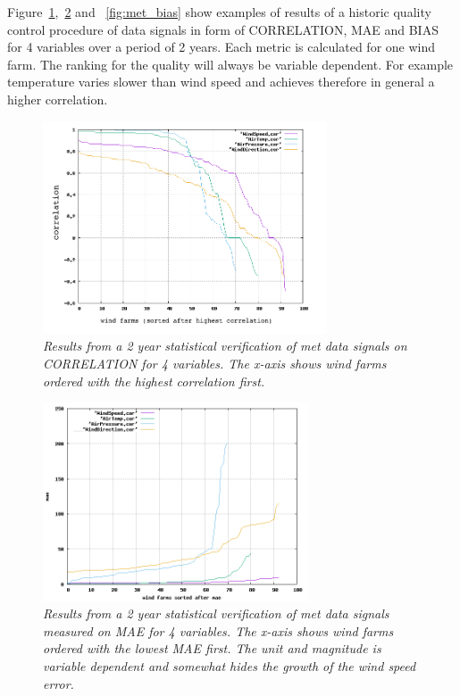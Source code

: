 Figure~\ref{fig:met_cor},~\ref{fig:met_mae} and ~\ref{fig:met_bias}  show examples of results of a historic quality control procedure of data signals in form of CORRELATION, MAE and BIAS for 4 variables over a period of 2 years. Each metric is calculated for one wind farm. The ranking for the quality will always be variable dependent. For example temperature varies slower than wind speed and achieves therefore in general a higher correlation.\\


\begin{figure}[h!]
\includegraphics[width=0.75\textwidth]{figures/met_cor.png}
\caption{\textit{Results from a 2 year statistical verification of met data signals on CORRELATION for 4 variables. The x-axis shows wind farms ordered with the highest correlation first.}} 
\label{fig:met_cor}
\end{figure}


\begin{figure}[h!]
\includegraphics[width=0.7\textwidth]{figures/met_mae.png}
\caption{\textit{Results from a 2 year statistical verification of met data signals measured on MAE for 4 variables. The x-axis shows wind farms ordered with the lowest MAE first. The unit and magnitude is variable dependent and somewhat hides the growth of the wind speed error.}} 
\label{fig:met_mae}
\end{figure}


